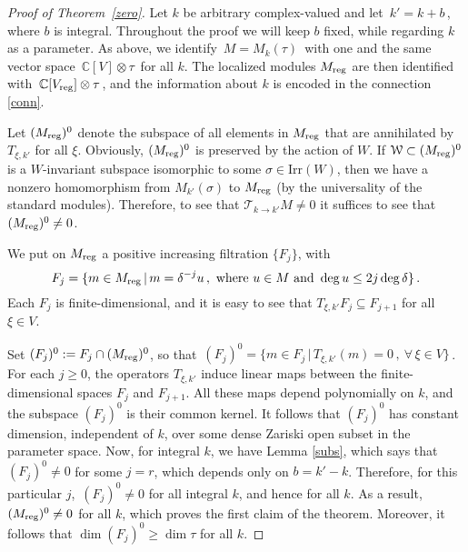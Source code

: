 \documentclass{amsart}
\theoremstyle{definition}
\theoremstyle{remark}
\numberwithin{equation}{section}
\begin{document}
\begin{proof}[Proof of Theorem~\ref{zero}]
Let $k$ be arbitrary complex-valued and let $\,k'=k+b\,$, where $b$ is
integral. Throughout the proof we will keep $b$ fixed, while
regarding $k$ as a parameter. As above, we identify $\,M = M_k(\tau)\,$ with one
and the same vector space $\,{\mathbb{C}}[V] \otimes \tau\,$ for all $k$. The localized
modules ${M_{\rm{reg}}}$ are then identified with $\,{\mathbb{C}}[{V_{\rm{reg}}}]\otimes\tau\,$, and the
information about $k$ is encoded in the connection \eqref{conn}.

Let $({M_{\rm{reg}}})^0$ denote the subspace of all elements in ${M_{\rm{reg}}}$ that
are annihilated by $T_{\xi,k'}$ for all $\xi$. Obviously,
$({M_{\rm{reg}}})^0$ is preserved by the action of $W$. If ${\mathcal{W}}\subset
({M_{\rm{reg}}})^0$ is a $W$-invariant subspace isomorphic to some
$\sigma\in{\mathrm{Irr}(W)}$, then we have a nonzero homomorphism from
$M_{k'}(\sigma)$ to ${M_{\rm{reg}}}$ (by the universality of the standard
modules). Therefore, to see that ${\mathcal{T}}_{k \to k'}M \ne 0$
it suffices to see that $({M_{\rm{reg}}})^0 \ne 0$.

We put on $ {M_{\rm{reg}}} $ a positive increasing filtration $ \{F_j\}$, with \begin{equation*}
    F_j=\{m\in{M_{\rm{reg}}}\,|\, m=\delta^{-j}u\,,\ \text{where}\ u\in M\
    \text{and}\ \deg u\le 2j\deg\delta\}\,.
\end{equation*}
Each $F_j$ is finite-dimensional, and it is easy to
see that $T_{\xi,k'}F_j\subseteq F_{j+1}$ for all $\xi\in V$.

Set $(F_j)^0:= F_j\cap ({M_{\rm{reg}}})^0$, so that
$\, (F_j)^0 = \{m\in F_j\,|\, T_{\xi,k'}(m)=0\, ,\ \forall \,\xi\in V\}\,$.
For each $j\ge 0$, the operators $T_{\xi,k'}$ induce linear
maps between the finite-dimensional spaces $F_j$ and $F_{j+1}$. All
these maps depend polynomially on $k$, and the subspace $(F_j)^0$ is
their common kernel. It follows that $(F_j)^0$ has constant dimension,
independent of $k$, over some dense Zariski open subset in the parameter space.
Now, for integral $k$, we have Lemma \ref{subs}, which says that
$(F_j)^0\ne 0$ for some $j=r$, which depends only on $b=k'-k$.
Therefore, for this particular $j$, $\,(F_j)^0\ne 0$ for
all integral $k$, and hence for all $k$. As a result, $({M_{\rm{reg}}})^0\ne 0$ for all $k$,
which proves the first claim of the theorem. Moreover,
it follows that $\dim (F_j)^0 \ge \dim\tau $ for all $k$.


\end{proof}
\end{document}
